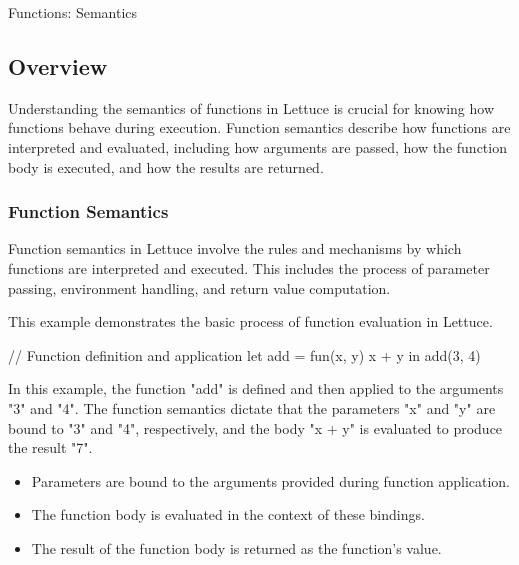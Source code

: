 \begin{notes}{Functions: Semantics}
    \subsection*{Overview}

    Understanding the semantics of functions in Lettuce is crucial for knowing how functions behave during execution. Function semantics describe how functions are interpreted and evaluated, including how arguments are passed, how the function body is executed, and how the results are returned.
    
    \subsubsection*{Function Semantics}
    
    Function semantics in Lettuce involve the rules and mechanisms by which functions are interpreted and executed. This includes the process of parameter passing, environment handling, and return value computation.
    
    \begin{highlight}
    
        This example demonstrates the basic process of function evaluation in Lettuce.
    
    \begin{code}[Lettuce]
    // Function definition and application
    let add = fun(x, y) {
        x + y
    } in
    add(3, 4)
    \end{code}
    
        In this example, the function "add" is defined and then applied to the arguments "3" and "4". The function semantics dictate that the parameters "x" and "y" are bound to "3" and "4", respectively, and the body "x + y" is evaluated to produce the result "7".
    
        \begin{itemize}
            \item Parameters are bound to the arguments provided during function application.
            \item The function body is evaluated in the context of these bindings.
            \item The result of the function body is returned as the function's value.
        \end{itemize}
    
    \end{highlight}
    

\end{notes}

